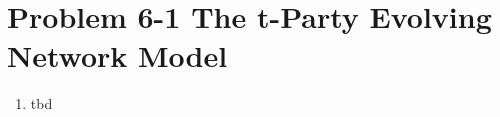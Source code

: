 \section{Problem 6-1 The t-Party Evolving Network Model}

\begin{enumerate}
	\item tbd
\end{enumerate}